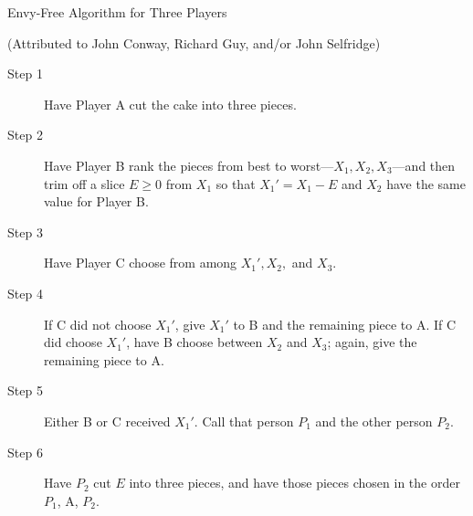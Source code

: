 \documentclass{article}
\begin{document}
{\LARGE
\begin{center}

{\huge Envy-Free Algorithm for Three Players
\smallskip

(Attributed to John Conway, Richard Guy, and/or John Selfridge)}

\end{center}

\begin{description}

\item [Step 1] Have Player A cut the cake into three pieces.

\item [Step 2] Have Player B rank the pieces from best to worst---$X_1, X_2, X_3$---and then trim off a slice $E\geq 0$ from $X_1$ so that ${X_1}'=X_1 - E$ and $X_2$ have the same value for Player B.

\item [Step 3] Have Player C choose from among ${X_1}', X_2,$ and $X_3$.

\item [Step 4] If C did not choose ${X_1}'$, give ${X_1}'$ to B and the remaining piece to A. If C did choose ${X_1}'$, have B choose between $X_2$ and $X_3$; again, give the remaining piece to A.

\item [Step 5] Either B or C received ${X_1}'$. Call that person $P_1$ and the other person $P_2$.

\item [Step 6] Have $P_2$ cut $E$ into three pieces, and have those pieces chosen in the order $P_1$, A, $P_2$.

\end{description}
}

\end{document}
